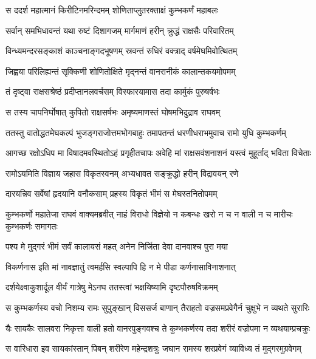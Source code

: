 \twolineshloka
{स ददर्श महात्मानं किरीटिनमरिन्दमम्}
{शोणिताप्लुतरक्ताक्षं कुम्भकर्णं महाबलः} %

\twolineshloka
{सर्वान् समभिधावन्तं यथा रुष्टं दिशागजम्}
{मार्गमाणं हरीन् क्रुद्धं राक्षसैः परिवारितम्} %

\twolineshloka
{विन्ध्यमन्दरसङ्काशं काञ्चनाङ्गदभूषणम्}
{स्रवन्तं रुधिरं वक्त्राद् वर्षमेघमिवोत्थितम्} %

\twolineshloka
{जिह्वया परिलिह्यन्तं सृक्किणी शोणितोक्षिते}
{मृद्नन्तं वानरानीकं कालान्तकयमोपमम्} %

\twolineshloka
{तं दृष्ट्वा राक्षसश्रेष्ठं प्रदीप्तानलवर्चसम्}
{विस्फारयामास तदा कार्मुकं पुरुषर्षभः} %

\twolineshloka
{स तस्य चापनिर्घोषात् कुपितो राक्षसर्षभः}
{अमृष्यमाणस्तं घोषमभिदुद्राव राघवम्} %

\twolineshloka
{ततस्तु वातोद्धतमेघकल्पं भुजङ्गराजोत्तमभोगबाहुः}
{तमापतन्तं धरणीधराभमुवाच रामो युधि कुम्भकर्णम्} %

\twolineshloka
{आगच्छ रक्षोऽधिप मा विषादमवस्थितोऽहं प्रगृहीतचापः}
{अवेहि मां राक्षसवंशनाशनं यस्त्वं मुहूर्ताद् भविता विचेताः} %

\twolineshloka
{रामोऽयमिति विज्ञाय जहास विकृतस्वनम्}
{अभ्यधावत सङ्क्रुद्धो हरीन् विद्रावयन् रणे} %

\twolineshloka
{दारयन्निव सर्वेषां हृदयानि वनौकसाम्}
{प्रहस्य विकृतं भीमं स मेघस्तनितोपमम्} %

\threelineshloka
{कुम्भकर्णो महातेजा राघवं वाक्यमब्रवीत्}
{नाहं विराधो विज्ञेयो न कबन्धः खरो न च}
{न वाली न च मारीचः कुम्भकर्णः समागतः} %

\twolineshloka
{पश्य मे मुद्गरं भीमं सर्वं कालायसं महत्}
{अनेन निर्जिता देवा दानवाश्च पुरा मया} %

\twolineshloka
{विकर्णनास इति मां नावज्ञातुं त्वमर्हसि}
{स्वल्पापि हि न मे पीडा कर्णनासाविनाशनात्} %

\twolineshloka
{दर्शयेक्ष्वाकुशार्दूल वीर्यं गात्रेषु मेऽनघ}
{ततस्त्वां भक्षयिष्यामि दृष्टपौरुषविक्रमम्} %

\twolineshloka
{स कुम्भकर्णस्य वचो निशम्य रामः सुपुङ्खान् विससर्ज बाणान्}
{तैराहतो वज्रसमप्रवेगैर्न चुक्षुभे न व्यथते सुरारिः} %

\twolineshloka
{यैः सायकैः सालवरा निकृत्ता वाली हतो वानरपुङ्गवश्च}
{ते कुम्भकर्णस्य तदा शरीरं वज्रोपमा न व्यथयाम्प्रचक्रुः} %

\twolineshloka
{स वारिधारा इव सायकांस्तान् पिबन् शरीरेण महेन्द्रशत्रुः}
{जघान रामस्य शरप्रवेगं व्याविध्य तं मुद्गरमुग्रवेगम्} %

